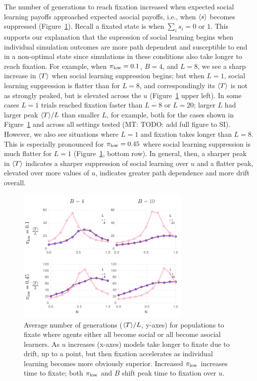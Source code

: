\documentclass[letterpaper,11.5pt]{scrartcl}
\newcommand{\mt}[1]{{\textcolor{myorange} {({\tiny MT:} #1)}}}
\begin{document}
The number of generations to reach fixation increased
when expected social learning payoffs approached expected asocial payoffs, i.e.,
when $\langle s \rangle$ becomes suppressed (Figure~\ref{fig:steps}). Recall a fixated
state is when $\sum_i s_i = 0 \text{ or } 1$.  This supports our explanation that
the supression of social learning begins when individual simulation outcomes are
more path dependent and susceptible to end in a non-optimal state since simulations
in these conditions also take longer to reach fixation.  For example, when
$\pi_{\mathrm{low}}=0.1$, $B=4$, and $L=8$, we see a sharp increase in $\langle T \rangle$ when social learning
suppression begins; but when $L=1$, social learning suppression is flatter
than for $L=8$, and  correspondingly its $\langle T \rangle$ is not as strongly peaked, but is
elevated across the $u$ (Figure~\ref{fig:steps} upper left).  In some cases $L=1$
trials reached fixation faster than $L=8$ or $L=20$; larger $L$ had larger peak $\langle T \rangle/L$
than smaller $L$, for example, both for the cases shown in Figure~\ref{fig:steps}
and across all settings tested \mt{TODO: add full figure to SI}. 
However, we also see situations where $L=1$ and fixation takes longer than $L=8$.
This is especially pronounced for
$\pi_{\mathrm{low}} = 0.45$ where social learning suppression is much flatter for $L=1$
(Figure~\ref{fig:steps}, bottom row). In general, then, a sharper peak in $\langle T \rangle$
indicates a sharper suppression of social learning over $u$ and a flatter peak,
elevated over more values of $u$, indicates greater path dependence and more 
drift overall.


\begin{figure}
  \caption{Average number of generations ($\langle T \rangle/L$, y-axes) for populations to fixate
  where agents either all become social or all become asocial learners. As
  $u$ increases (x-axes) models take longer to fixate due to drift, up to a point,
but then fixation accelerates as individual learning becomes more obviously 
superior. Increased $\pi_{\mathrm{low}}$ increases time to fixate; both $\pi_{\mathrm{low}}$ and $B$
shift peak time to fixation over $u$.} 
  \label{fig:steps}
\centering
    \includegraphics[width=0.75\textwidth]{Figures/stepResultsPlots.pdf}
\end{figure}
\end{document}
